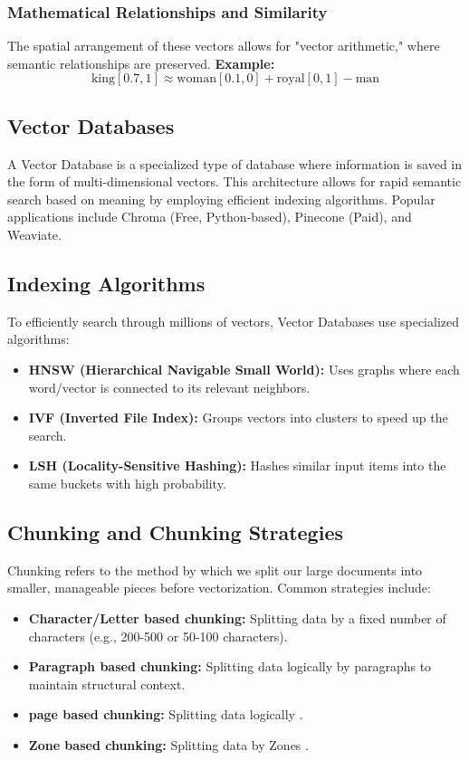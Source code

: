 \subsubsection{Mathematical Relationships and Similarity}
The spatial arrangement of these vectors allows for "vector arithmetic," where semantic relationships are preserved. 
\textbf{Example:}
$$ \text{king} [0.7, 1] \approx \text{woman} [0.1, 0] + \text{royal} [0, 1] - \text{man} $$

\subsection{Vector Databases}
A Vector Database is a specialized type of database where information is saved in the form of multi-dimensional vectors. This architecture allows for rapid semantic search based on meaning by employing efficient indexing algorithms. Popular applications include Chroma (Free, Python-based), Pinecone (Paid), and Weaviate.

\subsection{Indexing Algorithms}
To efficiently search through millions of vectors, Vector Databases use specialized algorithms:
\begin{itemize}
    \item \textbf{HNSW (Hierarchical Navigable Small World):} Uses graphs where each word/vector is connected to its relevant neighbors.
    \item \textbf{IVF (Inverted File Index):} Groups vectors into clusters to speed up the search.
    \item \textbf{LSH (Locality-Sensitive Hashing):} Hashes similar input items into the same buckets with high probability.
\end{itemize}

\subsection{Chunking and Chunking Strategies}
Chunking refers to the method by which we split our large documents into smaller, manageable pieces before vectorization. Common strategies include:
\begin{itemize}
    \item \textbf{Character/Letter based chunking:} Splitting data by a fixed number of characters (e.g., 200-500 or 50-100 characters).
    \item \textbf{Paragraph based chunking:} Splitting data logically by paragraphs to maintain structural context.
    \item \textbf{page based chunking:} Splitting data logically .
    \item \textbf{Zone based chunking:} Splitting data by Zones .
\end{itemize}

